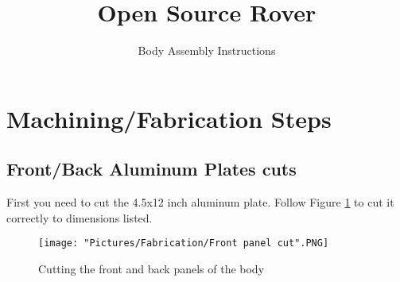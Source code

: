 \documentclass[12pt]{article}
\begin{document}
\title{Open Source Rover}
\author{Body Assembly Instructions}

\makeatletter         
\def\@maketitle{
\begin{center}	
	\makebox[\textwidth][c]{ \texttt{[image: "Pictures/Body/Body title".png]}}
	{\Huge \bfseries \sffamily \@title }\\[4ex] 
	{\huge \bfseries \sffamily \@author}\\[4ex] 
	\texttt{[image: "Pictures/Misc/JPL logo".png]}
\end{center}}
\makeatother

\maketitle

\newpage


\tableofcontents

\newpage

\section{Machining/Fabrication Steps}
\subsection{Front/Back Aluminum Plates cuts}

First you need to cut the 4.5x12 inch aluminum plate. Follow Figure \ref{fb panel cut} to cut it correctly to dimensions listed. 



\begin{figure}[H]
	\centering
	\texttt{[image: "Pictures/Fabrication/Front panel cut".PNG]}
  	\caption{Cutting the front and back panels of the body}
  	\label{fb panel cut}
\end{figure}
\end{document}
